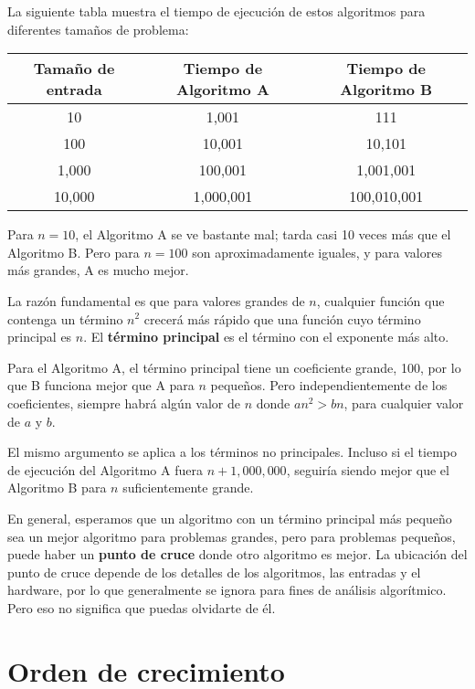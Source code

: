 La siguiente tabla muestra el tiempo de ejecución de estos algoritmos para diferentes tamaños de problema:

\begin{center}
\begin{tabular}{|c|c|c|}
\hline
Tamaño de entrada & Tiempo de Algoritmo A & Tiempo de Algoritmo B \\
\hline
10 & 1,001 & 111 \\
100 & 10,001 & 10,101 \\
1,000 & 100,001 & 1,001,001 \\
10,000 & 1,000,001 & 100,010,001 \\
\hline
\end{tabular}
\end{center}

Para \( n = 10 \), el Algoritmo A se ve bastante mal; tarda casi 10 veces más que el Algoritmo B. Pero para \( n = 100 \) son aproximadamente iguales, y para valores más grandes, A es mucho mejor.

La razón fundamental es que para valores grandes de \( n \), cualquier función que contenga un término \( n^2 \) crecerá más rápido que una función cuyo término principal es \( n \). El \textbf{término principal} es el término con el exponente más alto.

Para el Algoritmo A, el término principal tiene un coeficiente grande, 100, por lo que B funciona mejor que A para \( n \) pequeños. Pero independientemente de los coeficientes, siempre habrá algún valor de \( n \) donde \( an^2 > bn \), para cualquier valor de \( a \) y \( b \).

El mismo argumento se aplica a los términos no principales. Incluso si el tiempo de ejecución del Algoritmo A fuera \( n + 1,000,000 \), seguiría siendo mejor que el Algoritmo B para \( n \) suficientemente grande.

En general, esperamos que un algoritmo con un término principal más pequeño sea un mejor algoritmo para problemas grandes, pero para problemas pequeños, puede haber un \textbf{punto de cruce} donde otro algoritmo es mejor. La ubicación del punto de cruce depende de los detalles de los algoritmos, las entradas y el hardware, por lo que generalmente se ignora para fines de análisis algorítmico. Pero eso no significa que puedas olvidarte de él.

\section{Orden de crecimiento}

